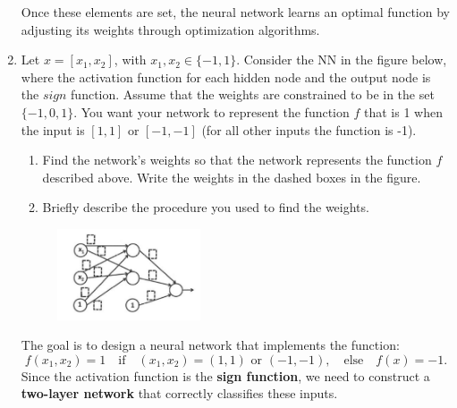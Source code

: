 \documentclass[a4paper,11pt,oneside]{book}
\begin{document}
\begin{enumerate}
\begin{solution}
                Once these elements are set, the neural network learns an optimal function by adjusting its weights through optimization algorithms.
            \end{solution}
        
        \clearpage
        \item Let $x = [x_1, x_2]$, with $x_1, x_2 \in \{-1, 1\}$. Consider the NN in the figure below, where the activation function for each hidden node and the output node is the $sign$ function. Assume that the weights are constrained to be in the set $\{-1, 0, 1\}$. You want your network to represent the function $f$ that is 1 when the input is $[1, 1]$ or $[-1, -1]$ (for all other inputs the function is -1).
        \begin{enumerate}
            \item Find the network's weights so that the network represents the function $f$ described above. Write the weights in the dashed boxes in the figure.
            \item Briefly describe the procedure you used to find the weights.
        \end{enumerate}

        \begin{figure}[H]
            \centering
            \includegraphics[width=0.4\textwidth,height=0.6\textheight,keepaspectratio]{images/3_31_Jan_2023.png}
        \end{figure}

            \begin{solution}
                The goal is to design a neural network that implements the function:
                \[
                f(x_1, x_2) = 1 \quad \text{if} \quad (x_1, x_2) = (1,1) \text{ or } (-1,-1), \quad \text{else} \quad f(x) = -1.
                \]
                Since the activation function is the \textbf{sign function}, we need to construct a \textbf{two-layer network} that correctly classifies these inputs.
                

\end{solution}
\end{enumerate}
\end{document}
